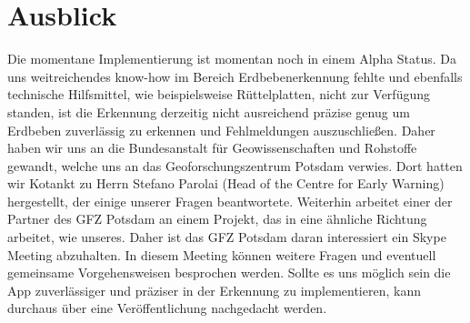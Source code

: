 \section{Ausblick}
Die momentane Implementierung ist momentan noch in einem Alpha Status.
Da uns weitreichendes know-how im Bereich Erdbebenerkennung fehlte und ebenfalls technische Hilfsmittel, wie beispielsweise Rüttelplatten, nicht zur Verfügung standen, ist die Erkennung derzeitig nicht ausreichend präzise genug um Erdbeben zuverlässig zu erkennen und Fehlmeldungen auszuschließen. 
Daher haben wir uns an die Bundesanstalt für Geowissenschaften und Rohstoffe gewandt, welche uns an das Geoforschungszentrum Potsdam verwies.
Dort hatten wir Kotankt zu Herrn Stefano Parolai (Head of the Centre for Early Warning) hergestellt, der einige unserer Fragen beantwortete.
Weiterhin arbeitet einer der Partner des GFZ Potsdam an einem Projekt, das in eine ähnliche Richtung arbeitet, wie unseres. Daher ist das GFZ Potsdam daran interessiert ein Skype Meeting abzuhalten. 
In diesem Meeting können weitere Fragen und eventuell gemeinsame Vorgehensweisen besprochen werden.
Sollte es uns möglich sein die App zuverlässiger und präziser in der Erkennung zu implementieren, kann durchaus über eine Veröffentlichung nachgedacht werden.   